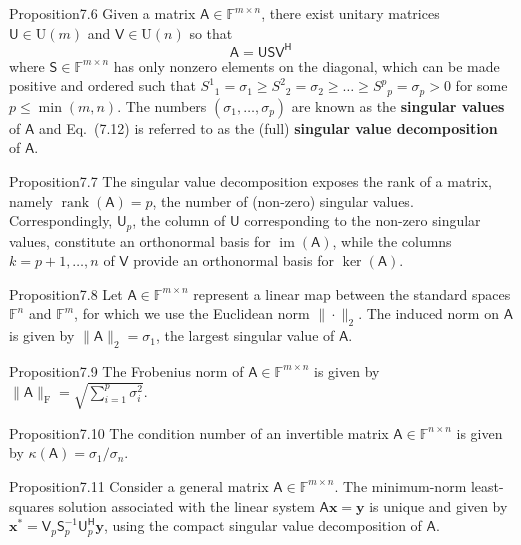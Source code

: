 \begin{res}{Proposition}{7.6}
Given a matrix $\mathsf A\in\mathbb F^{m\times n}$, there exist unitary matrices $\mathsf U\in\mathrm U(m)$ and $\mathsf V\in\mathrm U(n)$ so that
\begin{equation}\mathsf A=\mathsf{USV}^{\mathsf H}\tag{7.12}\end{equation}
where $\mathsf S\in\mathbb F^{m\times n}$ has only nonzero elements on the diagonal, which can be made positive and ordered such that $S^1{}_1=\sigma_1\ge S^2{}_2=\sigma_2\ge\ldots\ge S^p{}_p=\sigma_p>0$ for some $p\le\min(m,n)$. The numbers $(\sigma_1,\dots,\sigma_p)$ are known as the \textbf{singular values} of $\mathsf A$ and Eq.~(7.12) is referred to as the (full) \textbf{singular value decomposition} of $\mathsf A$.
\end{res}

\begin{res}{Proposition}{7.7}
The singular value decomposition exposes the rank of a matrix, namely $\operatorname{rank}(\mathsf A)=p$, the number of (non-zero) singular values. Correspondingly, $\mathsf U_p$, the column of $\mathsf U$ corresponding to the non-zero singular values, constitute an orthonormal basis for $\operatorname{im}(\mathsf A)$, while the columns $k=p+1,\dots,n$ of $\mathsf V$ provide an orthonormal basis for $\ker(\mathsf A)$.
\end{res}

\begin{res}{Proposition}{7.8}
Let $\mathsf A\in\mathbb F^{m\times n}$ represent a linear map between the standard spaces $\mathbb F^n$ and $\mathbb F^m$, for which we use the Euclidean norm $\|\cdot\|_2$. The induced norm on $\mathsf A$ is given by $\|\mathsf A\|_2=\sigma_1$, the largest singular value of $\mathsf A$.
\end{res}

\begin{res}{Proposition}{7.9}
The Frobenius norm of $\mathsf A\in\mathbb F^{m\times n}$ is given by $\|\mathsf A\|_{\mathrm F}=\sqrt{\sum_{i=1}^p\sigma_i^2}$.
\end{res}

\begin{res}{Proposition}{7.10}
The condition number of an invertible matrix $\mathsf A\in\mathbb F^{n\times n}$ is given by $\kappa(\mathsf A)=\sigma_1/\sigma_n$.
\end{res}

\begin{res}{Proposition}{7.11}
Consider a general matrix $\mathsf A\in\mathbb F^{m\times n}$. The minimum-norm least-squares solution associated with the linear system $\mathsf A\boldsymbol x=\boldsymbol y$ is unique and given by $\boldsymbol x^*=\mathsf V_p\mathsf S_p^{-1}\mathsf U_p^{\mathsf H}\boldsymbol y$, using the compact singular value decomposition of $\mathsf A$.
\end{res}

